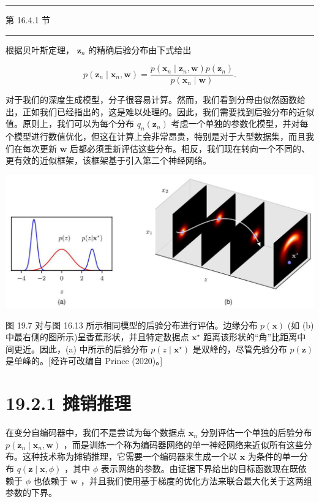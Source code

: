 \documentclass[10pt]{article}
\newcommand{\HRule}{\begin{center}\rule{0.9\linewidth}{0.2mm}\end{center}}
\begin{document}
\HRule

第 16.4.1 节

\HRule

根据贝叶斯定理， \({\mathbf{z}}_{n}\) 的精确后验分布由下式给出

\[
p\left( {{\mathbf{z}}_{n} \mid  {\mathbf{x}}_{n},\mathbf{w}}\right)  = \frac{p\left( {{\mathbf{x}}_{n} \mid  {\mathbf{z}}_{n},\mathbf{w}}\right) p\left( {\mathbf{z}}_{n}\right) }{p\left( {{\mathbf{x}}_{n} \mid  \mathbf{w}}\right) }. \tag{19.12}
\]

对于我们的深度生成模型，分子很容易计算。然而，我们看到分母由似然函数给出，正如我们已经指出的，这是难以处理的。因此，我们需要找到后验分布的近似值。原则上，我们可以为每个分布 \({q}_{n}\left( {\mathbf{z}}_{n}\right)\) 考虑一个单独的参数化模型，并对每个模型进行数值优化，但这在计算上会非常昂贵，特别是对于大型数据集，而且我们在每次更新 \(\mathbf{w}\) 后都必须重新评估这些分布。相反，我们现在转向一个不同的、更有效的近似框架，该框架基于引入第二个神经网络。

\begin{center}
\includegraphics[max width=1.0\textwidth]{images/0194e279-9b28-703a-88f4-c3ac21e2010d_591_234_366_1297_557_0.jpg}
\end{center}
\hspace*{3em} 

图 19.7 对与图 16.13 所示相同模型的后验分布进行评估。边缘分布 \(p\left( \mathbf{x}\right)\) (如 (b) 中最右侧的图所示)呈香蕉形状，并且特定数据点 \({\mathbf{x}}^{ \star  }\) 距离该形状的“角”比距离中间更近。因此，(a) 中所示的后验分布 \(p\left( {z \mid  {\mathbf{x}}^{ \star  }}\right)\) 是双峰的，尽管先验分布 \(p\left( \mathbf{z}\right)\) 是单峰的。[经许可改编自 Prince (2020)。]

\section*{19.2.1 摊销推理}

在变分自编码器中，我们不是尝试为每个数据点 \({\mathbf{x}}_{n}\) 分别评估一个单独的后验分布 \(p\left( {{\mathbf{z}}_{n} \mid  {\mathbf{x}}_{n},\mathbf{w}}\right)\) ，而是训练一个称为编码器网络的单一神经网络来近似所有这些分布。这种技术称为摊销推理，它需要一个编码器来生成一个以 \(\mathbf{x}\) 为条件的单一分布 \(q\left( {\mathbf{z} \mid  \mathbf{x},\phi }\right)\) ，其中 \(\phi\) 表示网络的参数。由证据下界给出的目标函数现在既依赖于 \(\phi\) 也依赖于 \(\mathbf{w}\) ，并且我们使用基于梯度的优化方法来联合最大化关于这两组参数的下界。
\end{document}
